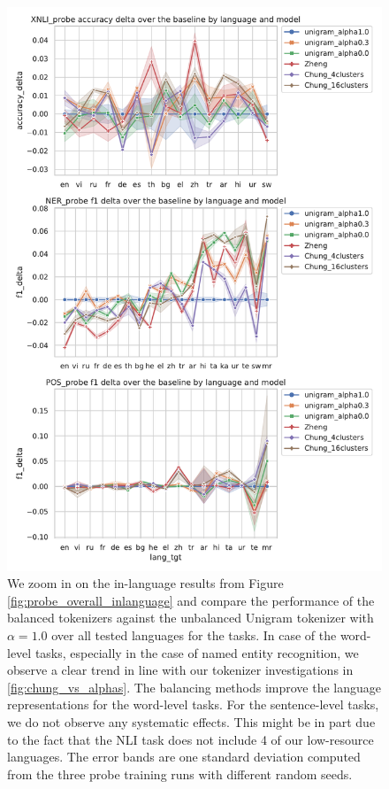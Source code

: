 \begin{figure}[H]
    \centering
    \includegraphics[width=\textwidth]{figures/probe_detailed_inlanguage_over_baseline.pdf}
    \caption{We zoom in on the in-language results from Figure \ref{fig:probe_overall_inlanguage} and compare the performance of the balanced tokenizers against the unbalanced Unigram tokenizer with $\alpha=1.0$ over all tested languages for the tasks. In case of the word-level tasks, especially in the case of named entity recognition, we observe a clear trend in line with our tokenizer investigations in \ref{fig:chung_vs_alphas}. The balancing methods improve the language representations for the word-level tasks. For the sentence-level tasks, we do not observe any systematic effects. This might be in part due to the fact that the NLI task does not include 4 of our low-resource languages. The error bands are one standard deviation computed from the three probe training runs with different random seeds.}
    \label{fig:probe_overall_inlanguage_over_baseline}
\end{figure}


